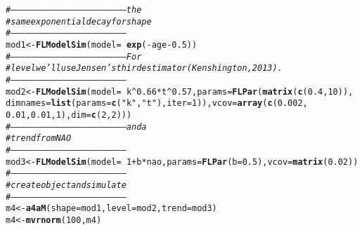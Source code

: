 \documentclass[a4paper,english,10pt]{article}\usepackage[]{graphicx}\usepackage[]{color}
\makeatletter
\newcommand{\hlnum}[1]{\textcolor[rgb]{0.686,0.059,0.569}{#1}}%
\newcommand{\hlstr}[1]{\textcolor[rgb]{0.192,0.494,0.8}{#1}}%
\newcommand{\hlcom}[1]{\textcolor[rgb]{0.678,0.584,0.686}{\textit{#1}}}%
\newcommand{\hlopt}[1]{\textcolor[rgb]{0,0,0}{#1}}%
\newcommand{\hlstd}[1]{\textcolor[rgb]{0.345,0.345,0.345}{#1}}%
\newcommand{\hlkwb}[1]{\textcolor[rgb]{0.69,0.353,0.396}{#1}}%
\newcommand{\hlkwc}[1]{\textcolor[rgb]{0.333,0.667,0.333}{#1}}%
\newcommand{\hlkwd}[1]{\textcolor[rgb]{0.737,0.353,0.396}{\textbf{#1}}}%
\newenvironment{kframe}{%
 \def\at@end@of@kframe{}%
 \ifinner\ifhmode%
  \def\at@end@of@kframe{\end{minipage}}%
  \begin{minipage}{\columnwidth}%
 \fi\fi%
 \def\FrameCommand##1{\hskip\@totalleftmargin \hskip-\fboxsep
 \colorbox{shadecolor}{##1}\hskip-\fboxsep
     \hskip-\linewidth \hskip-\@totalleftmargin \hskip\columnwidth}%
 \MakeFramed {\advance\hsize-\width
   \@totalleftmargin\z@ \linewidth\hsize
   \@setminipage}}%
 {\par\unskip\endMakeFramed%
 \at@end@of@kframe}
\newenvironment{knitrout}{}{} %
\makeatother
\begin{document}
\begin{knitrout}
\color{fgcolor}\begin{kframe}
\begin{alltt}
\hlcom{# -------------------------------------------------------------------- the}
\hlcom{# same exponential decay for shape}
\hlcom{# --------------------------------------------------------------------}
\hlstd{mod1} \hlkwb{<-} \hlkwd{FLModelSim}\hlstd{(}\hlkwc{model} \hlstd{=} \hlopt{~}\hlkwd{exp}\hlstd{(}\hlopt{-}\hlstd{age} \hlopt{-} \hlnum{0.5}\hlstd{))}
\hlcom{# -------------------------------------------------------------------- For}
\hlcom{# level we'll use Jensen's third estimator (Kenshington, 2013).}
\hlcom{# --------------------------------------------------------------------}
\hlstd{mod2} \hlkwb{<-} \hlkwd{FLModelSim}\hlstd{(}\hlkwc{model} \hlstd{=} \hlopt{~}\hlstd{k}\hlopt{^}\hlnum{0.66} \hlopt{*} \hlstd{t}\hlopt{^}\hlnum{0.57}\hlstd{,} \hlkwc{params} \hlstd{=} \hlkwd{FLPar}\hlstd{(}\hlkwd{matrix}\hlstd{(}\hlkwd{c}\hlstd{(}\hlnum{0.4}\hlstd{,} \hlnum{10}\hlstd{)),}
    \hlkwc{dimnames} \hlstd{=} \hlkwd{list}\hlstd{(}\hlkwc{params} \hlstd{=} \hlkwd{c}\hlstd{(}\hlstr{"k"}\hlstd{,} \hlstr{"t"}\hlstd{),} \hlkwc{iter} \hlstd{=} \hlnum{1}\hlstd{)),} \hlkwc{vcov} \hlstd{=} \hlkwd{array}\hlstd{(}\hlkwd{c}\hlstd{(}\hlnum{0.002}\hlstd{,}
    \hlnum{0.01}\hlstd{,} \hlnum{0.01}\hlstd{,} \hlnum{1}\hlstd{),} \hlkwc{dim} \hlstd{=} \hlkwd{c}\hlstd{(}\hlnum{2}\hlstd{,} \hlnum{2}\hlstd{)))}
\hlcom{# -------------------------------------------------------------------- and a}
\hlcom{# trend from NAO}
\hlcom{# --------------------------------------------------------------------}
\hlstd{mod3} \hlkwb{<-} \hlkwd{FLModelSim}\hlstd{(}\hlkwc{model} \hlstd{=} \hlopt{~}\hlnum{1} \hlopt{+} \hlstd{b} \hlopt{*} \hlstd{nao,} \hlkwc{params} \hlstd{=} \hlkwd{FLPar}\hlstd{(}\hlkwc{b} \hlstd{=} \hlnum{0.5}\hlstd{),} \hlkwc{vcov} \hlstd{=} \hlkwd{matrix}\hlstd{(}\hlnum{0.02}\hlstd{))}
\hlcom{# --------------------------------------------------------------------}
\hlcom{# create object and simulate}
\hlcom{# --------------------------------------------------------------------}
\hlstd{m4} \hlkwb{<-} \hlkwd{a4aM}\hlstd{(}\hlkwc{shape} \hlstd{= mod1,} \hlkwc{level} \hlstd{= mod2,} \hlkwc{trend} \hlstd{= mod3)}
\hlstd{m4} \hlkwb{<-} \hlkwd{mvrnorm}\hlstd{(}\hlnum{100}\hlstd{, m4)}
\end{alltt}
\end{kframe}
\end{knitrout}
\end{document}
